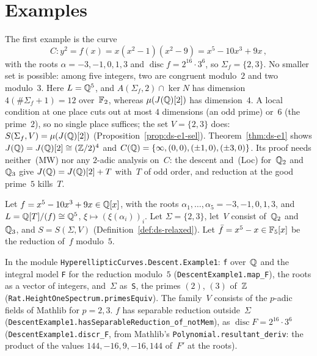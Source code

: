 \section{Examples}
\label{sec:ds-examples}

\begin{remark}
\label{rem:ds-e1}
The first example is the curve
\[ C \colon y^2 = f(x) = x(x^2 - 1)(x^2 - 9) = x^5 - 10x^3 + 9x\,, \]
with the roots $\alpha = -3, -1, 0, 1, 3$ and $\operatorname{disc} f = 2^{16} \cdot 3^6$, so
$\Sigma_f = \{2, 3\}$. No smaller set is possible: among five integers, two are congruent
modulo~$2$ and two modulo~$3$. Here $L = \mathbb{Q}^5$, and $A(\Sigma_f, 2) \cap \ker N$ has dimension
$4(\#\Sigma_f + 1) = 12$ over~$\mathbb{F}_2$, whereas $\mu(J(\mathbb{Q})[2])$ has dimension~$4$. A local
condition at one place cuts out at most $4$ dimensions (an odd prime) or~$6$ (the prime~$2$), so
no single place suffices; the set $V = \{2, 3\}$ does: $S(\Sigma_f, V) = \mu(J(\mathbb{Q})[2])$
(Proposition~\ref{prop:ds-e1-sel}). Theorem~\ref{thm:ds-e1} shows $J(\mathbb{Q}) = J(\mathbb{Q})[2] \cong
(\mathbb{Z}/2)^4$ and $C(\mathbb{Q}) = \{\infty, (0, 0), (\pm 1, 0), (\pm 3, 0)\}$. Its proof needs neither~(MW)
nor any $2$-adic analysis on~$C$: the descent and~(Loc) for~$\mathbb{Q}_2$ and~$\mathbb{Q}_3$ give
$J(\mathbb{Q}) = J(\mathbb{Q})[2] + T$ with~$T$ of odd order, and reduction at the good prime~$5$ kills~$T$.
\end{remark}

\begin{setting}
\label{set:ds-e1}
\leanok
Let $f = x^5 - 10x^3 + 9x \in \mathbb{Q}[x]$, with the roots
$\alpha_1, \dots, \alpha_5 = -3, -1, 0, 1, 3$, and $L = \mathbb{Q}[T]/(f) \cong \mathbb{Q}^5$,
$\xi \mapsto (\xi(\alpha_i))_i$. Let $\Sigma = \{2, 3\}$, let~$V$ consist of~$\mathbb{Q}_2$ and~$\mathbb{Q}_3$,
and $S = S(\Sigma, V)$ (Definition~\ref{def:ds-relaxed}). Let $\bar f = x^5 - x \in \mathbb{F}_5[x]$ be
the reduction of~$f$ modulo~$5$.
\end{setting}

\begin{remark}[Formalization]
In the module \texttt{HyperellipticCurves.Descent.Example1}: \texttt{f} over~$\mathbb{Q}$ and the
integral model \texttt{F} for the reduction modulo~$5$ (\texttt{DescentExample1.map\_F}), the
roots as a vector of integers, and~$\Sigma$ as~\texttt{S}, the primes $(2)$, $(3)$ of~$\mathbb{Z}$
(\texttt{Rat.HeightOneSpectrum.primesEquiv}). The family~$V$ consists of the $p$-adic fields of
Mathlib for $p = 2, 3$. $f$ has separable reduction outside~$\Sigma$
(\texttt{DescentExample1.hasSeparableReduction\_of\_notMem}), as
$\operatorname{disc} F = 2^{16} \cdot 3^6$ (\texttt{DescentExample1.discr\_F}, from Mathlib's
\texttt{Polynomial.resultant\_deriv}: the product of the values $144, -16, 9, -16, 144$ of~$F'$ at
the roots).
\end{remark}

